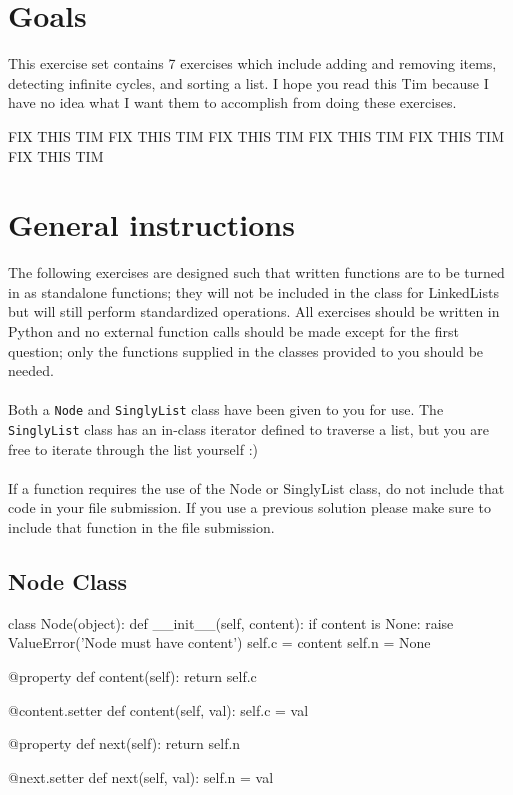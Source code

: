 \documentclass{42-en}
\begin{document}
\chapter{Goals}
    This exercise set contains 7 exercises which include adding and
    removing items, detecting infinite cycles, and sorting a list. I
    hope you read this Tim because I have no idea what I want them to
    accomplish from doing these exercises.
    
    FIX THIS TIM FIX THIS TIM FIX THIS TIM FIX THIS TIM FIX THIS TIM FIX THIS TIM 




\chapter{General instructions}
    The following exercises are designed such that written functions are
    to be turned in as standalone functions; they will not be included
    in the class for LinkedLists but will still perform standardized
    operations. All exercises should be written in Python and no external
    function calls should be made except for the first question; only the
    functions supplied in the classes provided to you should be needed.
    \\
    \\
    Both a \texttt{Node} and \texttt{SinglyList} class have been given to
    you for use. The \texttt{SinglyList} class has an in-class iterator defined to
    traverse a list, but you are free to iterate through the list yourself :)
    \\
    \\
    If a function requires the use of the Node or SinglyList class, do not 
    include that code in your file submission. If you use a previous solution
    please make sure to include that function in the file submission.

\newpage
    \section{Node Class}

    	\begin{42pycode}
class Node(object):
	def __init__(self, content):
		if content is None:
			raise ValueError('Node must have content')
		self.c = content
		self.n = None
	
	@property
	def content(self):
		return self.c

	@content.setter
	def content(self, val):
		self.c = val
	
	@property
	def next(self):
		return self.n
	
	@next.setter
	def next(self, val):
		self.n = val
\end{42pycode}
\end{document}
